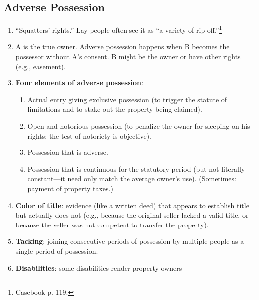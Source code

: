 % 

\subsection{Adverse Possession}

\begin{enumerate}
    \item ``Squatters' rights.'' Lay people often see it as ``a variety of 
    rip-off.''\footnote{Casebook p. 119.}
    \item A is the true owner. Adverse possession happens when B becomes the 
    possessor without A's consent. B might be the owner or have other rights 
    (e.g., easement).
    \item \textbf{Four elements of adverse possession}:
    \begin{enumerate}
        \item Actual entry giving exclusive possession (to trigger the statute 
        of limitations and to stake out the property being claimed).
        \item Open and notorious possession (to penalize the owner for 
        sleeping on his rights; the test of notoriety is objective).
        \item Possession that is adverse.
        \item Possession that is continuous for the statutory period (but not 
        literally constant---it need only match the average owner's use).
        \items (Sometimes: payment of property taxes.)
    \end{enumerate}
    \item \textbf{Color of title}: evidence (like a written deed) that appears 
    to establish title but actually does not (e.g., because the original 
    seller lacked a valid title, or because the seller was not competent to 
    transfer the property).
    \item \textbf{Tacking}: joining consecutive periods of possession by 
    multiple people as a single period of possession. %
    \item \textbf{Disabilities}: some disabilities render property owners 

\end{enumerate}
